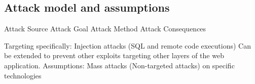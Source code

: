 \subsection{Attack model and assumptions}
Attack Source
Attack Goal
Attack Method
Attack Consequences

Targeting specifically:
Injection attacks (SQL and remote code executions)
Can be extended to prevent other exploits targeting other layers of the web application. 
Assumptions:
Mass attacks (Non-targeted attacks) on specific technologies